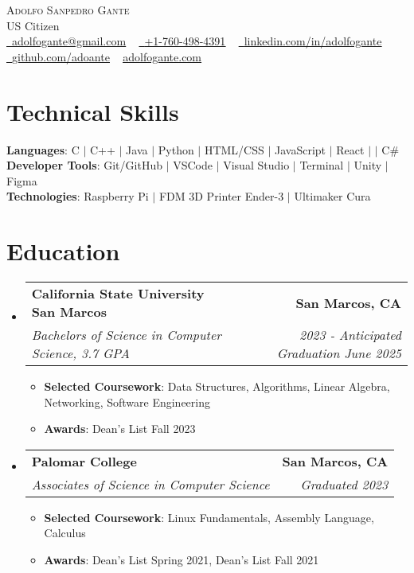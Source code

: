 \documentclass[letterpaper,11pt]{article}
\makeatletter
\newcommand{\resumeItem}[1]{
  \item\small{
    {#1 \vspace{-3pt}}
  }
}
\newcommand{\resumeSubheading}[4]{
  \vspace{-3pt}\item
    \begin{tabular*}{1.0\textwidth}[t]{l@{\extracolsep{\fill}}r}
      \textbf{#1} & \textbf{\small #2} \\
      \textit{\small#3} & \textit{\small #4} \\
    \end{tabular*}\vspace{-7pt}
}
\newcommand{\resumeSubHeadingListStart}{\begin{itemize}[leftmargin=0.0in, label={}]}
\newcommand{\resumeSubHeadingListEnd}{\end{itemize}}
\newcommand{\resumeItemListStart}{\begin{itemize}}
\newcommand{\resumeItemListEnd}{\end{itemize}\vspace{0pt}}
\makeatother
\begin{document}
    \begin{center}
        {\Huge\scshape Adolfo Sanpedro Gante} 
        \\ US Citizen \\
        \small
        \href{mailto:adolfogante@gmail.com}{\raisebox{-0.2\height}\faEnvelope\  \underline{adolfogante@gmail.com}} ~
        \href{tel:+17604984391}{\raisebox{-0.2\height}\faMobile\  \underline{+1-760-498-4391}} ~ 
        \href{https://www.linkedin.com/in/adolfogante/}{\raisebox{-0.2\height}\faLinkedin\ \underline{linkedin.com/in/adolfogante}}  ~
        \href{https://github.com/adoante}{\raisebox{-0.2\height}\faGithub\ \underline{github.com/adoante}} ~
        \href{https://adolfogante.com/}{\underline{adolfogante.com}}
    \end{center}

\section{Technical Skills}

    \vspace{-7pt}
    \begin{itemize}
    [leftmargin=0.15in, label={}]\small{\item{
        \textbf{Languages}{: C $|$ C++  $|$ Java $|$ Python  $|$ HTML/CSS  $|$ JavaScript $|$ React $|$  $|$ C\#} \\
        \textbf{Developer Tools}{: Git/GitHub $|$ VSCode $|$ Visual Studio $|$ Terminal $|$ Unity $|$ Figma} \\
        \textbf{Technologies}{: Raspberry Pi  $|$ FDM 3D Printer Ender-3  $|$  Ultimaker Cura} \\
        }}
    \end{itemize}

\section{Education}
  \resumeSubHeadingListStart
  
    \resumeSubheading
    {California State University San Marcos}{San Marcos, CA}
    {Bachelors of Science in Computer Science, 3.7 GPA}{2023 - Anticipated Graduation June 2025}
      \resumeItemListStart
        \resumeItem{\textbf{Selected Coursework}: Data Structures, Algorithms, Linear Algebra, Networking, Software Engineering}
        \resumeItem{\textbf{Awards}: Dean's List Fall 2023}
      \resumeItemListEnd
    \resumeSubheading
    {Palomar College}{San Marcos, CA}
    {Associates of Science in Computer Science}{Graduated 2023}
      \resumeItemListStart
        \resumeItem{\textbf{Selected Coursework}: Linux Fundamentals, Assembly Language, Calculus}
        \resumeItem{\textbf{Awards}: Dean's List Spring 2021, Dean's List Fall 2021}
      \resumeItemListEnd
  \resumeSubHeadingListEnd
\end{document}
